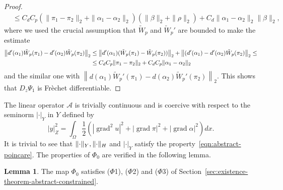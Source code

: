 \documentclass[a4paper,10pt,twoside]{amsbook}
\numberwithin{section}{chapter}
\numberwithin{equation}{chapter}
\theoremstyle{definition}
\newtheorem{lemma}[prop]{Lemma}
\DeclareMathOperator{\grad}{grad}
\DeclarePairedDelimiter{\norm}{\lVert}{\rVert}
\begin{document}
\begin{proof}
\[\begin{split}
&\le C_d{C}_p\left(\|\pi_1-\pi_2\|_2+\|\alpha_1-\alpha_2\|_2\right)\left(\|\beta\|_2+\|\rho\|_2\right)+C_d\|\alpha_1-\alpha_2\|_2\|\beta\|_2,
\end{split}
\]
where we used the crucial assumption that $\tilde W_p$ and $\tilde W_p'$ are bounded to make the estimate
\[
\begin{split}
\left\|d'(\alpha_1)\tilde W_p(\pi_1)-d'(\alpha_2)\tilde W_p(\pi_2)\right\|_2&\le\left\|d'(\alpha_1)(\tilde W_p(\pi_1)-\tilde W_p(\pi_2))\right\|_2+\left\|(d'(\alpha_1)-d'(\alpha_2)\tilde W_p(\pi_2)\right\|_2\le\\
&\le C_dC_p\norm{\pi_1-\pi_2}_2+C_dC_p\norm{\alpha_1-\alpha_2}_2
\end{split}
\]
and the similar one with $\left\|d(\alpha_1)\tilde W_p'(\pi_1)-d(\alpha_2)\tilde W_p'(\pi_2)\right\|_2$. This shows that $D_z\Psi_1$ is Frèchet differentiable.
\end{proof}
The linear operator $\mathcal{A}$ is trivially continuous and is coercive with respect to the seminorm $|\cdot|_Y$ in $Y$ defined by
\[
|y|_Z^2=\int_\Omega\frac{1}{2}\left(|\grad^2u|^2+|\grad\pi|^2+|\grad\alpha|^2\right)dx.
\]
It is trivial to see that $\norm{\cdot}_Y,\norm{\cdot}_H$ and $|\cdot|_Y$ satisfy the property~\eqref{eqn:abstract-poincare}. The properties of $\Phi_0$ are verified in the following lemma.
\begin{lemma}
The map $\Phi_0$ satisfies ($\Phi$1), ($\Phi$2) and ($\Phi$3) of Section~\ref{sec:existence-theorem-abstract-constrained}.
\end{lemma}
\end{document}
